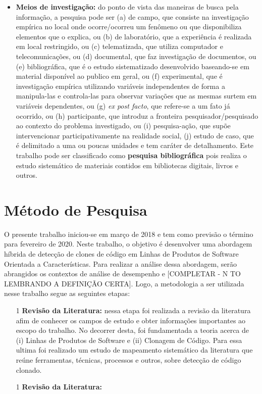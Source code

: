 \begin{itemize}
	\item \textbf{Meios de investigação:} do ponto de vista das maneiras de busca pela informação, a pesquisa pode ser (a) de campo, que consiste na investigação empírica no local onde ocorre/ocorreu um fenômeno ou que disponibiliza elementos que o explica, ou (b) de laboratório, que a experiência é realizada em local restringido, ou (c) telematizada, que utiliza computador e telecomunicações, ou (d) documental, que faz investigação de documentos, ou (e) bibliográfica, que é o estudo sistematizado desenvolvido baseando-se em material disponível ao publico em geral, ou (f) experimental, que é investigação empírica utilizando variáveis independentes de forma a manipula-las e controla-las para observar variações que as mesmas surtem em variáveis dependentes, ou (g) \textit{ex post facto}, que refere-se a um fato já ocorrido, ou (h) participante, que introduz a fronteira pesquisador/pesquisado ao contexto do problema investigado, ou (i) pesquisa-ação, que supõe intervencionar participativamente na realidade social, (j) estudo de caso, que é delimitado a uma ou poucas unidades e tem caráter de detalhamento. Este trabalho pode ser classificado como \textbf{pesquisa bibliográfica} pois realiza o estudo sistemático de materiais contidos em bibliotecas digitais, livros e outros.
	
\end{itemize}

\section{Método de Pesquisa}

O presente trabalho iniciou-se em março de 2018 e tem como previsão o término para fevereiro de 2020. Neste trabalho, o objetivo é desenvolver uma abordagem híbrida de detecção de clones de código em Linhas de Produtos de Software Orientada a Características. Para realizar a análise dessa abordagem, serão abrangidos os contextos de análise de desempenho e [COMPLETAR - N TO LEMBRANDO A DEFINIÇÃO CERTA]. Logo, a metodologia a ser utilizada nesse trabalho segue as seguintes etapas:

\begin{itemize}
	\item[1] \textbf{Revisão da Literatura:} nessa etapa foi realizada a revisão da literatura afim de conhecer os campos de estudo e obter informações importantes ao escopo do trabalho. No decorrer desta, foi fundamentada a teoria acerca de (i) Linhas de Produtos de Software e (ii) Clonagem de Código. Para essa ultima foi realizado um estudo de mapeamento sistemático da literatura que reúne ferramentas, técnicas, processos e outros, sobre detecção de código clonado. 
	
	\item[1] \textbf{Revisão da Literatura:}
\end{itemize}





